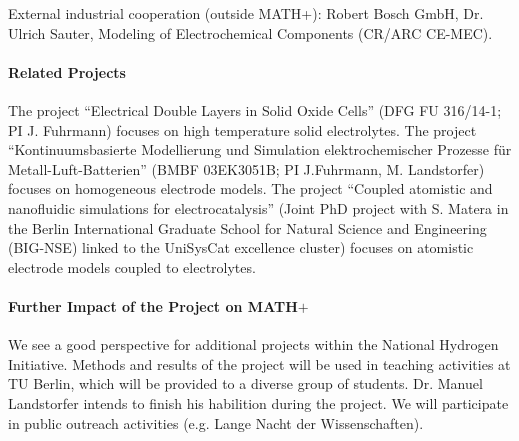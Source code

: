 \documentclass[a4paper,10pt]{article}
\begin{document}
External industrial cooperation (outside MATH+): Robert Bosch GmbH, Dr. Ulrich Sauter, Modeling of Electrochemical Components (CR/ARC CE-MEC).

\paragraph{Related Projects}
The project ``Electrical Double Layers in Solid Oxide Cells'' (DFG FU 316/14-1; PI J. Fuhrmann) focuses
  on high temperature solid electrolytes.
The project  ``Kontinuumsbasierte Modellierung und Simulation elektrochemischer Prozesse für Metall-Luft-Batterien''
  (BMBF  03EK3051B; PI J.Fuhrmann, M. Landstorfer) focuses on homogeneous electrode models.
The project  ``Coupled atomistic and nanofluidic simulations for electrocatalysis'' (Joint PhD project with S. Matera
  in the  Berlin International Graduate School for Natural Science and Engineering (BIG-NSE) linked
  to the UniSysCat excellence cluster) focuses on atomistic electrode models coupled to electrolytes.


\paragraph{Further Impact of the Project on MATH$+$}
We see a good perspective for additional projects within the National Hydrogen Initiative.
%
Methods and results of the project will be used in teaching activities at TU Berlin,
%
which will be provided to a diverse group of students.
%
%
Dr. Manuel Landstorfer intends to finish his habilition during the project. %
%
We will participate in public outreach activities (e.g. Lange Nacht der Wissenschaften).
\end{document}
